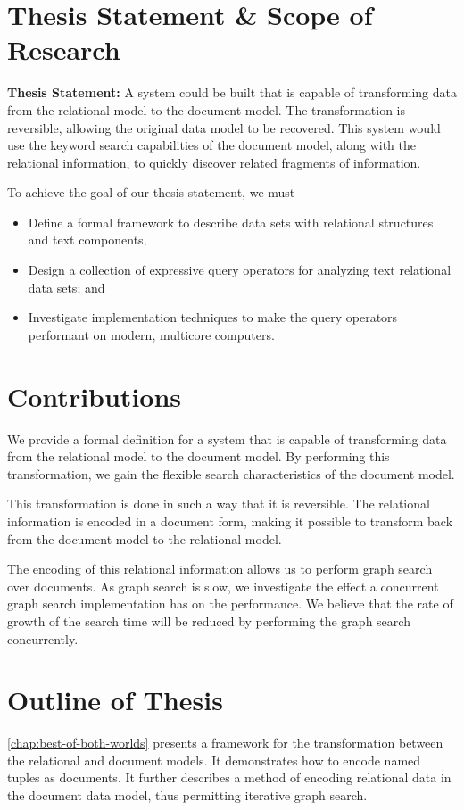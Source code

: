 	\section{Thesis Statement \& Scope of Research}
		\begin{displayquote}
			\textbf{Thesis Statement:}  A system could be built that is capable of transforming data from the relational model to the document model.  The transformation is reversible, allowing the original data model to be recovered.  This system would use the keyword search capabilities of the document model, along with the relational information, to quickly discover related fragments of information.
		\end{displayquote}
		
		To achieve the goal of our thesis statement, we must
		
		\begin{itemize}
			\item Define a formal framework to describe data sets with relational structures and text components,
			\item Design a collection of expressive query operators for analyzing text relational data sets; and
			\item Investigate implementation techniques to make the query operators performant on modern, multicore computers.
		\end{itemize}
		
	 \section{Contributions}
	 	We provide a formal definition for a system that is capable of transforming data from the relational model to the document model.  By performing this transformation, we gain the flexible search characteristics of the document model.
	 	
	 	This transformation is done in such a way that it is reversible.  The relational information is encoded in a document form, making it possible to transform back from the document model to the relational model.
	 	
	 	The encoding of this relational information allows us to perform graph search over documents.  As graph search is slow, we investigate the effect a concurrent graph search implementation has on the performance.  We believe that the rate of growth of the search time will be reduced by performing the graph search concurrently.
	
	\section{Outline of Thesis}
		\cref{chap:best-of-both-worlds} presents a framework for the transformation between the relational and document models.  It demonstrates how to encode named tuples as documents.  It further describes a method of encoding relational data in the document data model, thus permitting iterative graph search.
		
